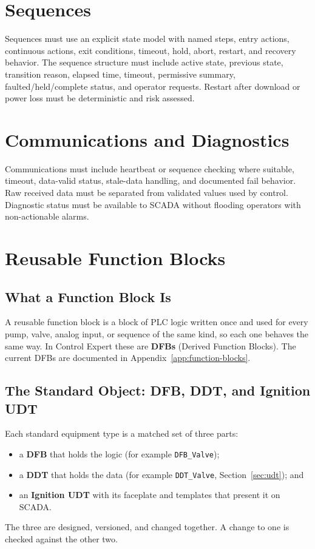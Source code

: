 \section{Sequences}
Sequences must use an explicit state model with named steps, entry actions, continuous actions, exit conditions, timeout, hold, abort, restart, and recovery behavior. The sequence structure must include active state, previous state, transition reason, elapsed time, timeout, permissive summary, faulted/held/complete status, and operator requests. Restart after download or power loss must be deterministic and risk assessed.

\section{Communications and Diagnostics}
Communications must include heartbeat or sequence checking where suitable, timeout, data-valid status, stale-data handling, and documented fail behavior. Raw received data must be separated from validated values used by control. Diagnostic status must be available to SCADA without flooding operators with non-actionable alarms.

\section{Reusable Function Blocks}\label{sec:reusable-fbs}
\subsection{What a Function Block Is}
A reusable function block is a block of PLC logic written once and used for every pump, valve, analog input, or sequence of the same kind, so each one behaves the same way. In Control Expert these are \textbf{DFBs} (Derived Function Blocks). The current DFBs are documented in Appendix~\ref{app:function-blocks}.

\subsection{The Standard Object: DFB, DDT, and Ignition UDT}
Each standard equipment type is a matched set of three parts:
\begin{itemize}[itemsep=1pt]
  \item a \textbf{DFB} that holds the logic (for example \texttt{DFB\_Valve});
  \item a \textbf{DDT} that holds the data (for example \texttt{DDT\_Valve}, Section~\ref{sec:udt}); and
  \item an \textbf{Ignition UDT} with its faceplate and templates that present it on SCADA.
\end{itemize}
The three are designed, versioned, and changed together. A change to one is checked against the other two.

